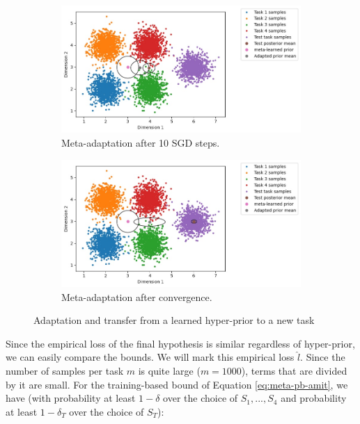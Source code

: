 \documentclass{article}
\theoremstyle{definition}
\begin{document}
\begin{figure}[h!]
	\centering
	\begin{subfigure}[b]{0.49\textwidth}
		\centering
		\includegraphics[width=\textwidth]{toy_example_aml_mid.JPG}
		\caption{Meta-adaptation after 10 SGD steps.}
	\end{subfigure}
	\hfill
	\begin{subfigure}[b]{0.49\textwidth}
		\centering
		\includegraphics[width=\textwidth]{toy_example_aml_fin.JPG}
		\caption{Meta-adaptation after convergence.}	 	
	\end{subfigure}
	\hfill
	\caption{Adaptation and transfer from a learned hyper-prior to a new task}	 
	\label{fig:ex-aml}
\end{figure}

Since the empirical loss of the final hypothesis is similar regardless of hyper-prior, we can easily compare the bounds. We will mark this empirical loss $\hat{l}$. Since the number of samples per task $m$ is quite large ($m=1000$), terms that are divided by it are small. For the training-based bound of Equation \ref{eq:meta-pb-amit}, we have (with probability at least $1-\delta$ over the choice of $S_1,...,S_4$ and probability at least $1-\delta_T$ over the choice of $S_T$):
\end{document}
